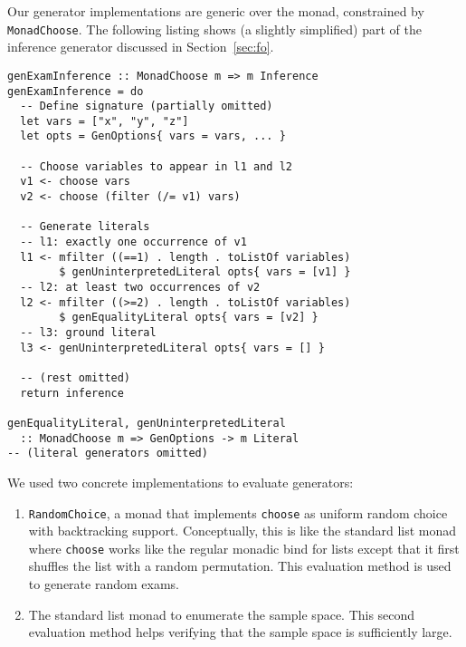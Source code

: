 Our generator implementations are generic over the monad, constrained by \texttt{MonadChoose}.
The following listing shows (a slightly simplified) part of the inference generator
discussed in Section~\ref{sec:fo}.
\begin{lstlisting}
genExamInference :: MonadChoose m => m Inference
genExamInference = do
  -- Define signature (partially omitted)
  let vars = ["x", "y", "z"]
  let opts = GenOptions{ vars = vars, ... }

  -- Choose variables to appear in l1 and l2
  v1 <- choose vars
  v2 <- choose (filter (/= v1) vars)

  -- Generate literals
  -- l1: exactly one occurrence of v1
  l1 <- mfilter ((==1) . length . toListOf variables)
        $ genUninterpretedLiteral opts{ vars = [v1] }
  -- l2: at least two occurrences of v2
  l2 <- mfilter ((>=2) . length . toListOf variables)
        $ genEqualityLiteral opts{ vars = [v2] }
  -- l3: ground literal
  l3 <- genUninterpretedLiteral opts{ vars = [] }

  -- (rest omitted)
  return inference

genEqualityLiteral, genUninterpretedLiteral
  :: MonadChoose m => GenOptions -> m Literal
-- (literal generators omitted)
\end{lstlisting}

We used two concrete implementations to evaluate generators:
\begin{enumerate}
    \item
        \texttt{RandomChoice}, a monad that implements \texttt{choose}
        as uniform random choice with backtracking support.
        Conceptually, this is like the standard list monad
        where \texttt{choose} works like the regular monadic bind for lists
        except that it first shuffles the list with a random permutation.
        This evaluation method is used to generate random exams.
    \item
        The standard list monad to enumerate the sample space.
        This second evaluation method helps verifying that the sample space is sufficiently large.
\end{enumerate}
